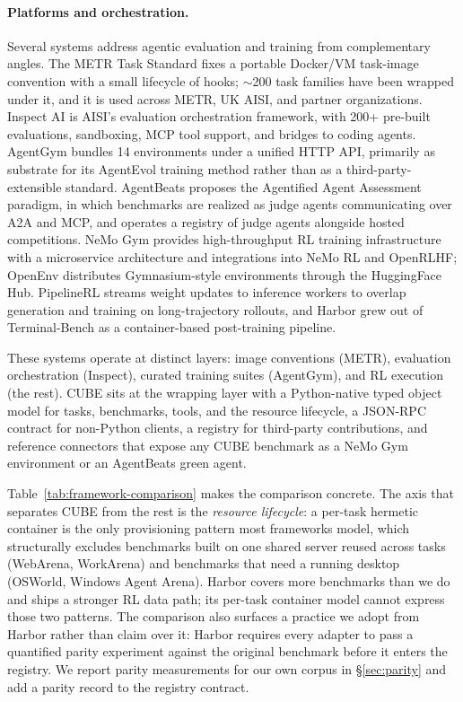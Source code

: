 \documentclass{article}
\begin{document}
\paragraph{Platforms and orchestration.}
Several systems address agentic evaluation and training from complementary angles.
The METR Task Standard \citep{metr_task_standard_2024} fixes a portable Docker/VM task-image convention with a small lifecycle of hooks; $\sim$200 task families have been wrapped under it, and it is used across METR, UK AISI, and partner organizations.
Inspect AI \citep{inspect_ai} is AISI's evaluation orchestration framework, with 200+ pre-built evaluations, sandboxing, MCP \citep{mcp2024} tool support, and bridges to coding agents.
AgentGym \citep{xi2025agentgym} bundles 14 environments under a unified HTTP API, primarily as substrate for its AgentEvol training method rather than as a third-party-extensible standard.
AgentBeats \citep{agentbeats2025} proposes the Agentified Agent Assessment paradigm, in which benchmarks are realized as judge agents communicating over A2A and MCP, and operates a registry of judge agents alongside hosted competitions.
NeMo Gym \citep{nemo-gym} provides high-throughput RL training infrastructure with a microservice architecture and integrations into NeMo RL and OpenRLHF; OpenEnv \citep{openenv2025} distributes Gymnasium-style environments through the HuggingFace Hub.
PipelineRL \citep{piche2025pipelinerl} streams weight updates to inference workers to overlap generation and training on long-trajectory rollouts, and Harbor \citep{Shaw_Harbor_Framework_2025} grew out of Terminal-Bench as a container-based post-training pipeline.

These systems operate at distinct layers: image conventions (METR), evaluation orchestration (Inspect), curated training suites (AgentGym), and RL execution (the rest). CUBE sits at the wrapping layer with a Python-native typed object model for tasks, benchmarks, tools, and the resource lifecycle, a JSON-RPC contract for non-Python clients, a registry for third-party contributions, and reference connectors that expose any CUBE benchmark as a NeMo Gym environment or an AgentBeats green agent.

Table~\ref{tab:framework-comparison} makes the comparison concrete. The axis
that separates CUBE from the rest is the \emph{resource lifecycle}: a
per-task hermetic container is the only provisioning pattern most frameworks
model, which structurally excludes benchmarks built on one shared server
reused across tasks (WebArena, WorkArena) and benchmarks that need a running
desktop (OSWorld, Windows Agent Arena). Harbor covers more benchmarks than we
do and ships a stronger RL data path; its per-task container model cannot
express those two patterns. The comparison also surfaces a practice we adopt
from Harbor rather than claim over it: Harbor requires every adapter to pass a
quantified parity experiment against the original benchmark before it enters
the registry. We report parity measurements for our own corpus in
\S\ref{sec:parity} and add a parity record to the registry contract.
\end{document}
